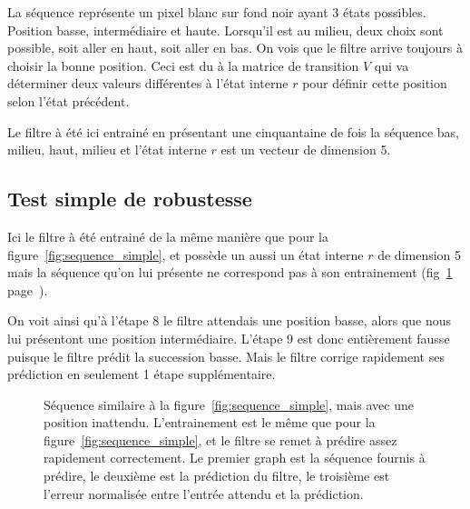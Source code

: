 La séquence représente un pixel blanc sur fond noir ayant 3 états possibles.
Position basse, intermédiaire et haute. Lorsqu'il est au milieu, deux choix sont
possible, soit aller en haut, soit aller en bas. On vois que le filtre arrive
toujours à choisir la bonne position. Ceci est du à la matrice de transition
$V$ qui va déterminer deux valeurs différentes à l'état interne $r$ pour définir
cette position selon l'état précédent\cite{Rao1999}.

Le filtre à été ici entrainé en présentant une cinquantaine de fois la séquence
bas, milieu, haut, milieu et l'état interne $r$ est un vecteur de dimension 5.


\subsection{Test simple de robustesse} %
\label{sub:Test simple de robustesse}

Ici le filtre à été entrainé de la même manière que pour la
figure~\ref{fig:sequence_simple}, et possède un aussi un état interne $r$ de
dimension 5 mais la séquence qu'on lui présente ne correspond pas à son
entrainement (fig~\ref{fig:sequence_simple_erreur}
page~\pageref{fig:sequence_simple_erreur}).

On voit ainsi qu'à l'étape 8 le filtre attendais une position basse, alors que
nous lui présentont une position intermédiaire. L'étape 9 est donc entièrement
fausse puisque le filtre prédit la succession basse. Mais le filtre corrige
rapidement ses prédiction en seulement 1 étape supplémentaire.

\begin{figure}[ht]
   \begin{center}
   \end{center}
   \caption[Prédiction de séquence simple, avec erreur]{Séquence similaire à la
   figure~\ref{fig:sequence_simple}, mais avec une position inattendu.
   L'entrainement est le même que pour la figure~\ref{fig:sequence_simple}, et
   le filtre se remet à prédire assez rapidement correctement. Le premier graph
   est la séquence fournis à prédire, le deuxième est la prédiction du filtre,
   le troisième est l'erreur normalisée entre l'entrée attendu et la
   prédiction.}
   \label{fig:sequence_simple_erreur}
\end{figure}


